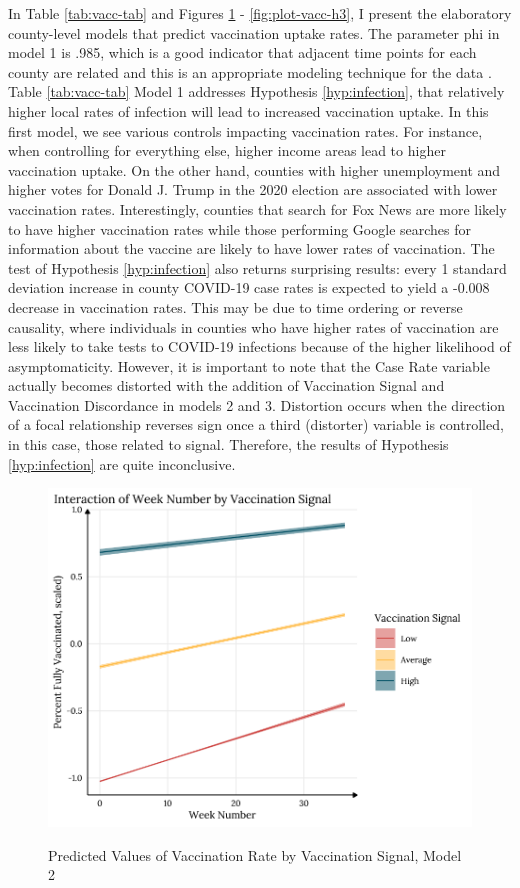 In Table \ref{tab:vacc-tab} and Figures \ref{fig:plot-vacc-h2} -
\ref{fig:plot-vacc-h3}, I present the elaboratory county-level models that
predict vaccination uptake rates. The parameter phi in model 1 is .985, which is
a good indicator that adjacent time points for each county are related and this
is an appropriate modeling technique for the data \citep{finch_etal14}. Table
\ref{tab:vacc-tab} Model 1 addresses Hypothesis \ref{hyp:infection}, that
relatively higher local rates of infection will lead to increased vaccination
uptake. In this first model, we see various controls impacting vaccination
rates. For instance, when controlling for everything else, higher income areas
lead to higher vaccination uptake. On the other hand, counties with higher
unemployment and higher votes for Donald J. Trump in the 2020 election are
associated with lower vaccination rates. Interestingly, counties that search for
Fox News are more likely to have higher vaccination rates while those performing
Google searches for information about the vaccine are likely to have lower rates
of vaccination. The test of Hypothesis \ref{hyp:infection} also returns
surprising results: every 1 standard deviation increase in county COVID-19 case
rates is expected to yield a -0.008 decrease in vaccination rates. This may be
due to time ordering or reverse causality, where individuals in counties who
have higher rates of vaccination are less likely to take tests to COVID-19
infections because of the higher likelihood of asymptomaticity. However, it is
important to note that the Case Rate variable actually becomes distorted with
the addition of Vaccination Signal and Vaccination Discordance in models 2 and
3. Distortion occurs when the direction of a focal relationship reverses sign
once a third (distorter) variable is controlled, in this case, those related to
signal. Therefore, the results of Hypothesis \ref{hyp:infection} are quite
inconclusive.

\begin{figure}
{\centering \includegraphics[width=0.8\linewidth]{figs/paper3/plot-vacc-h2-1}}
\caption{Predicted Values of Vaccination Rate by Vaccination Signal, Model 2}\label{fig:plot-vacc-h2}
\end{figure}

